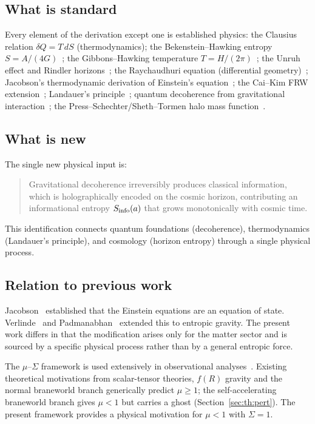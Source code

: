 \subsection{What is standard}
Every element of the derivation except one is established physics: the Clausius relation $\delta Q=T\,dS$ (thermodynamics); the Bekenstein--Hawking
entropy $S=A/(4G)$~\cite{Bekenstein1973,Hawking1975}; the Gibbons--Hawking temperature $T=H/(2\pi)$~\cite{GibbonsHawking1977}; the Unruh effect and Rindler horizons~\cite{Unruh1976}; the
Raychaudhuri equation (differential geometry)~\cite{Raychaudhuri1955}; Jacobson's thermodynamic derivation of Einstein's equation~\cite{Jacobson1995}; the Cai--Kim FRW
extension~\cite{CaiKim2005}; Landauer's principle~\cite{Landauer1961}; quantum decoherence from gravitational interaction~\cite{Zurek2003}; the Press--Schechter/Sheth--Tormen
halo mass function~\cite{PressSchechter1974,ShethTormen1999}.

\subsection{What is new}
The single new physical input is:
\begin{quote}
Gravitational decoherence irreversibly produces classical information, which is holographically encoded on the cosmic horizon, contributing an
informational entropy $S_{\rm info}(a)$ that grows monotonically with cosmic time. \conjecture
\end{quote}
This identification connects quantum foundations (decoherence), thermodynamics (Landauer's principle), and cosmology (horizon entropy) through a single
physical process.

\subsection{Relation to previous work}
Jacobson~\cite{Jacobson1995} established that the Einstein equations are an equation of state. Verlinde~\cite{Verlinde2011} and Padmanabhan~\cite{Padmanabhan2010} extended this to
entropic gravity. The present work differs in that the modification arises only for the matter sector and is sourced by a specific physical process
rather than by a general entropic force.

The $\mu$--$\Sigma$ framework is used extensively in observational analyses~\cite{PogosianSilvestri2016,DESY3Ext,Andrade2024,DESI2024VII}. Existing theoretical motivations from
scalar-tensor theories, $f(R)$ gravity and the normal braneworld branch generically predict $\mu\ge1$; the self-accelerating braneworld branch gives
$\mu<1$ but carries a ghost (Section~\ref{sec:th:pert}). The present framework provides a physical motivation for $\mu<1$ with $\Sigma=1$.

